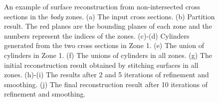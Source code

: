 \begin{figure} [htbp]
{\begin{minipage}[b]{0.22\textwidth}
    \end{minipage}}
  \caption{An example of surface reconstruction from non-intersected cross sections in the \textit{body} zones.
  (a) The input cross sections.
  (b) Partition result. The red planes are the bounding planes of each zone and the numbers represent the indices of the zones.
  (c)-(d) Cylinders generated from the two cross sections in Zone 1.
  (e) The union of cylinders in Zone 1.
  (f) The unions of cylinders in all zones.
  (g) The initial reconstruction result obtained by stitching surfaces in all zones.
  (h)-(i) The results after 2 and 5 iterations of refinement and  smoothing.
  (j) The final reconstruction result after 10 iterations of refinement and smoothing.}
  \label{fig:cshape} %
\end{figure}

